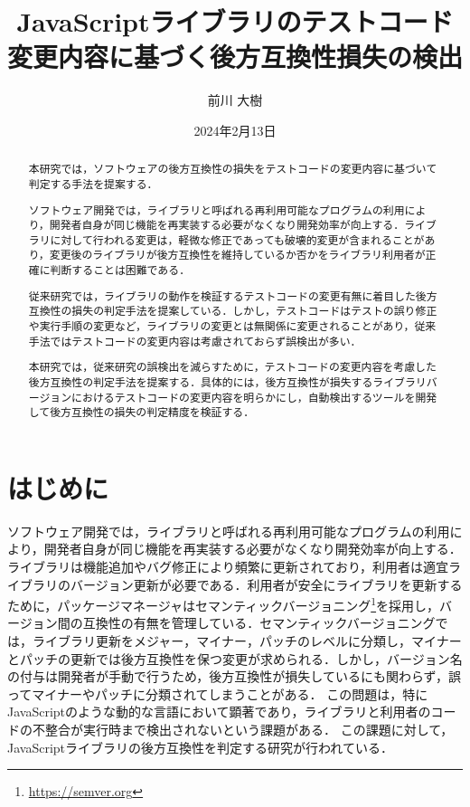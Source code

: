\documentclass[11pt,dvipdfmx]{jreport}
\title{JavaScriptライブラリのテストコード変更内容に基づく後方互換性損失の検出}
\author{前川 大樹}
\date{2024年2月13日}	%
\begin{document}
\maketitle

\begin{abstract}
本研究では，ソフトウェアの後方互換性の損失をテストコードの変更内容に基づいて判定する手法を提案する．

ソフトウェア開発では，ライブラリと呼ばれる再利用可能なプログラムの利用により，開発者自身が同じ機能を再実装する必要がなくなり開発効率が向上する．ライブラリに対して行われる変更は，軽微な修正であっても破壊的変更が含まれることがあり，変更後のライブラリが後方互換性を維持しているか否かをライブラリ利用者が正確に判断することは困難である．

従来研究では，ライブラリの動作を検証するテストコードの変更有無に着目した後方互換性の損失の判定手法を提案している．しかし，テストコードはテストの誤り修正や実行手順の変更など，ライブラリの変更とは無関係に変更されることがあり，従来手法ではテストコードの変更内容は考慮されておらず誤検出が多い．

本研究では，従来研究の誤検出を減らすために，テストコードの変更内容を考慮した後方互換性の判定手法を提案する．具体的には，後方互換性が損失するライブラリバージョンにおけるテストコードの変更内容を明らかにし，自動検出するツールを開発して後方互換性の損失の判定精度を検証する．

\end{abstract}

\tableofcontents



\newpage
{}	%



\chapter{はじめに}
ソフトウェア開発では，ライブラリと呼ばれる再利用可能なプログラムの利用により，開発者自身が同じ機能を再実装する必要がなくなり開発効率が向上する．ライブラリは機能追加やバグ修正により頻繁に更新されており，利用者は適宜ライブラリのバージョン更新が必要である．利用者が安全にライブラリを更新するために，パッケージマネージャはセマンティックバージョニング\footnote{\url{https://semver.org}}を採用し，バージョン間の互換性の有無を管理している．セマンティックバージョニングでは，ライブラリ更新をメジャー，マイナー，パッチのレベルに分類し，マイナーとパッチの更新では後方互換性を保つ変更が求められる．しかし，バージョン名の付与は開発者が手動で行うため，後方互換性が損失しているにも関わらず，誤ってマイナーやパッチに分類されてしまうことがある．
この問題は，特にJavaScriptのような動的な言語において顕著であり，ライブラリと利用者のコードの不整合が実行時まで検出されないという課題がある．
この課題に対して，JavaScriptライブラリの後方互換性を判定する研究が行われている．
\end{document}
